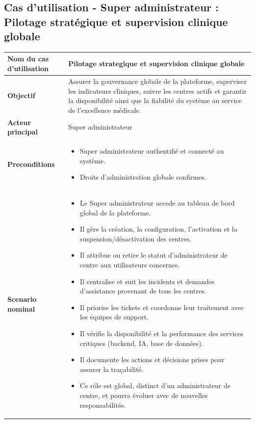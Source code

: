 \subsection{Cas d'utilisation - Super administrateur : Pilotage stratégique et supervision clinique globale}
\begin{table}[H]
\centering
\renewcommand{\arraystretch}{1.3}
\begin{tabular}{|p{5cm}|p{10cm}|}
\hline
\textbf{Nom du cas d'utilisation} & Pilotage strategique et supervision clinique globale \\ \hline

\textbf{Objectif} & Assurer la gouvernance globale de la plateforme, superviser les indicateurs cliniques, suivre les centres actifs et garantir la disponibilité ainsi que la fiabilité du système au service de l'excellence médicale. \\ \hline

\textbf{Acteur principal} & Super administrateur \\ \hline

\textbf{Preconditions} &
\begin{itemize}
\item Super administrateur authentifié et connecté au système.
\item Droits d'administration globale confirmes.
\end{itemize} \\ \hline

\textbf{Scenario nominal} &
\begin{itemize}
\item Le Super administrateur accede au tableau de bord global de la plateforme.
\item Il gère la création, la configuration, l'activation et la suspension/désactivation des centres.
\item Il attribue ou retire le statut d'administrateur de centre aux utilisateurs concernes.
\item Il centralise et suit les incidents et demandes d'assistance provenant de tous les centres.
    \item Il priorise les tickets et coordonne leur traitement avec les équipes de support.
    \item Il vérifie la disponibilité et la performance des services critiques (backend, IA, base de données).
\item Il documente les actions et décisions prises pour assurer la traçabilité.
\item Ce rôle est global, distinct d'un administrateur de centre, et pourra évoluer avec de nouvelles responsabilités.
\end{itemize} \\ \hline


\end{tabular}
\end{table}
